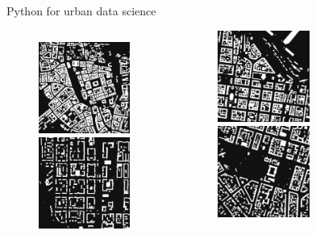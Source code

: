 \documentclass{beamer}
\begin{document}
\begin{frame}{Python for urban data science}
\begin{figure}

\begin{columns}[t]

\centering

\includegraphics[width=3cm,height=3cm]{images/Kyiv1km_bldgs.png}
\includegraphics[width=3cm,height=3cm]{images/Odesa1km_bldgs.png}
\begin{center}

\includegraphics[width=3cm,height=3cm]{images/Lviv1km_bldgs.png}

\includegraphics[height=3cm]{images/Donetsk1km_bldgs.png}
\end{center}

\end{columns}
\end{figure}
\end{frame}
\end{document}
